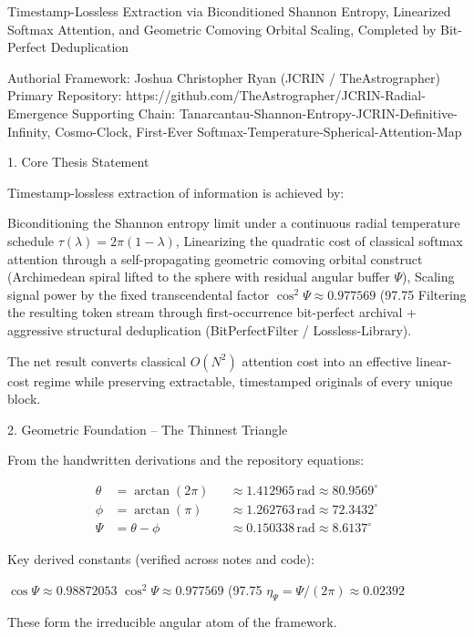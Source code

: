 Timestamp-Lossless Extraction via Biconditioned Shannon Entropy, Linearized Softmax Attention, and Geometric Comoving Orbital Scaling, Completed by Bit-Perfect Deduplication

Authorial Framework: Joshua Christopher Ryan (JCRIN / TheAstrographer)  
Primary Repository: https://github.com/TheAstrographer/JCRIN-Radial-Emergence  
Supporting Chain: Tanarcantau-Shannon-Entropy-JCRIN-Definitive-Infinity, Cosmo-Clock, First-Ever Softmax-Temperature-Spherical-Attention-Map

1. Core Thesis Statement

Timestamp-lossless extraction of information is achieved by:

Biconditioning the Shannon entropy limit under a continuous radial temperature schedule \(\tau(\lambda) = 2\pi(1-\lambda)\),
Linearizing the quadratic cost of classical softmax attention through a self-propagating geometric comoving orbital construct (Archimedean spiral lifted to the sphere with residual angular buffer \(\Psi\)),
Scaling signal power by the fixed transcendental factor \(\cos^2\Psi \approx 0.977569\) (97.75 %
Filtering the resulting token stream through first-occurrence bit-perfect archival + aggressive structural deduplication (BitPerfectFilter / Lossless-Library).

The net result converts classical \(O(N^2)\) attention cost into an effective linear-cost regime while preserving extractable, timestamped originals of every unique block.

2. Geometric Foundation – The Thinnest Triangle

From the handwritten derivations and the repository equations:

\[
\begin{align*}
\theta &= \arctan(2\pi) &&\approx 1.412965\,\text{rad} \approx 80.9569^\circ \\
\phi &= \arctan(\pi) &&\approx 1.262763\,\text{rad} \approx 72.3432^\circ \\
\Psi &= \theta - \phi &&\approx 0.150338\,\text{rad} \approx 8.6137^\circ
\end{align*}
\]

Key derived constants (verified across notes and code):

\(\cos\Psi \approx 0.98872053\)
\(\cos^2\Psi \approx 0.977569\) (97.75 %
\(\eta_\Psi = \Psi / (2\pi) \approx 0.02392\)

These form the irreducible angular atom of the framework.

